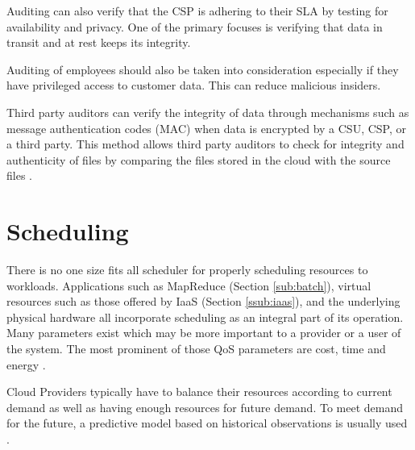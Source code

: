 \documentclass[12pt]{article}
\begin{document}
Auditing can also verify that the CSP is adhering to their SLA by testing for availability and privacy. One of the primary focuses is verifying that data in transit and at rest keeps its integrity.

Auditing of employees should also be taken into consideration especially if they have privileged access to customer data. This can reduce malicious insiders.

Third party auditors can verify the integrity of data through mechanisms such as message authentication codes (MAC) when data is encrypted by a CSU, CSP, or a third party. This method allows third party auditors to check for integrity and authenticity of files by comparing the files stored in the cloud with the source files \cite{wang2010toward}.








\section{Scheduling} \label{sec:scheduling}











There is no one size fits all scheduler for properly scheduling resources to workloads. Applications such as MapReduce (Section \ref{sub:batch}), virtual resources such as those offered by IaaS (Section \ref{ssub:iaas}), and the underlying physical hardware all incorporate scheduling as an integral part of its operation. Many parameters exist which may be more important to a provider or a user of the system. The most prominent of those QoS parameters are cost, time and energy \cite{Singh2016}.

Cloud Providers typically have to balance their resources according to current demand as well as having enough resources for future demand. To meet demand for the future, a predictive model based on historical observations is usually used \cite{Jennings2015}.
\end{document}
